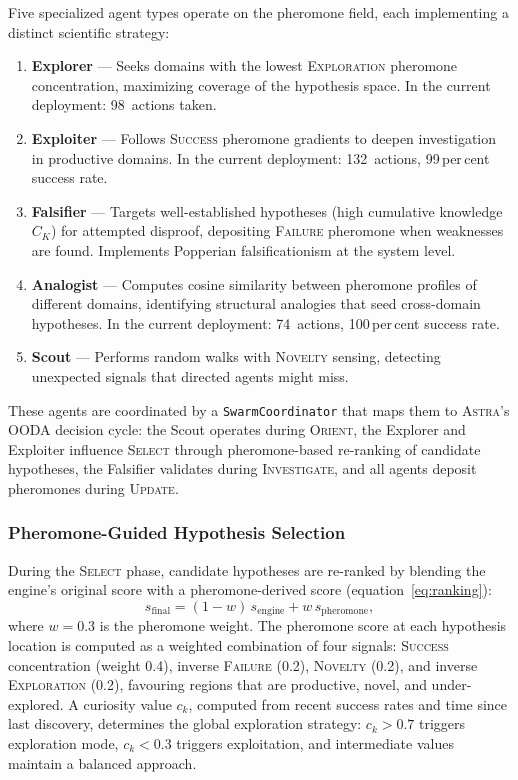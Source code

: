 \documentclass[usenatbib]{rasti}
\newcommand{\astra}{\textsc{Astra}\xspace}
\begin{document}
Five specialized agent types operate on the pheromone field, each implementing a distinct scientific strategy:
\begin{enumerate}
  \item \textbf{Explorer} --- Seeks domains with the lowest \textsc{Exploration} pheromone concentration, maximizing coverage of the hypothesis space. In the current deployment: 98~actions taken.
  \item \textbf{Exploiter} --- Follows \textsc{Success} pheromone gradients to deepen investigation in productive domains. In the current deployment: 132~actions, 99\,per\,cent success rate.
  \item \textbf{Falsifier} --- Targets well-established hypotheses (high cumulative knowledge $C_K$) for attempted disproof, depositing \textsc{Failure} pheromone when weaknesses are found. Implements Popperian falsificationism at the system level.
  \item \textbf{Analogist} --- Computes cosine similarity between pheromone profiles of different domains, identifying structural analogies that seed cross-domain hypotheses. In the current deployment: 74~actions, 100\,per\,cent success rate.
  \item \textbf{Scout} --- Performs random walks with \textsc{Novelty} sensing, detecting unexpected signals that directed agents might miss.
\end{enumerate}
These agents are coordinated by a \texttt{SwarmCoordinator} that maps them to \astra's OODA decision cycle: the Scout operates during \textsc{Orient}, the Explorer and Exploiter influence \textsc{Select} through pheromone-based re-ranking of candidate hypotheses, the Falsifier validates during \textsc{Investigate}, and all agents deposit pheromones during \textsc{Update}.

\subsubsection{Pheromone-Guided Hypothesis Selection}

During the \textsc{Select} phase, candidate hypotheses are re-ranked by blending the engine's original score with a pheromone-derived score (equation~\ref{eq:ranking}):
\begin{equation}
  s_{\mathrm{final}} = (1 - w)\,s_{\mathrm{engine}} + w\,s_{\mathrm{pheromone}},
  \label{eq:ranking}
\end{equation}
where $w = 0.3$ is the pheromone weight.
The pheromone score at each hypothesis location is computed as a weighted combination of four signals: \textsc{Success} concentration (weight 0.4), inverse \textsc{Failure} (0.2), \textsc{Novelty} (0.2), and inverse \textsc{Exploration} (0.2), favouring regions that are productive, novel, and under-explored.
A curiosity value $c_k$, computed from recent success rates and time since last discovery, determines the global exploration strategy: $c_k > 0.7$ triggers exploration mode, $c_k < 0.3$ triggers exploitation, and intermediate values maintain a balanced approach.
\end{document}

